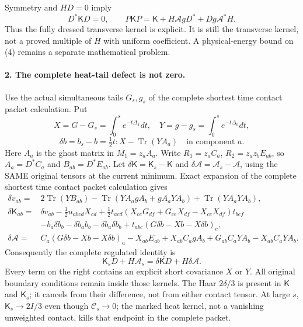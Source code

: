 \documentclass[11pt]{article}
\begin{document}
Symmetry and $HD=0$ imply
\[
 D^*\mathsf K D=0,\qquad
 \boxed{P\mathsf K P=\mathsf K+H\mathcal A gD^*
                                  +Dg\mathcal A^*H.}             \tag{4}
\]
Thus the fully dressed transverse kernel is explicit. It is still the
transverse kernel, not a proved multiple of $H$ with uniform coefficient.
A physical-energy bound on (4) remains a separate mathematical problem.

\paragraph{2. The complete heat-tail defect is not zero.}
Use the actual simultaneous tails $G_s,g_s$ of the complete shortest time contact packet calculation. Put
\[
 X=G-G_s=\int_0^s e^{-t\Delta_1}dt,\quad
 Y=g-g_s=\int_0^s e^{-t\Delta_0}dt,
\]
\[
 \delta b=b_s-b=\tfrac12t:X-\operatorname{Tr}(Y A_a)
 \quad\text{in component }a.
\]
Here $A_a$ is the ghost matrix in $M_1=z_a A_a$.
Write $R_1=z_a C_a$, $R_2=z_a z_b E_{ab}$, so
$A_a=D^*C_a$ and $B_{ab}=D^*E_{ab}$.
Let $\delta\mathsf K=\mathsf K_s-\mathsf K$ and
$\delta\mathcal A=\mathcal A_s-\mathcal A$, using the SAME original
tensors at the current minimum. Exact expansion of the complete shortest time contact packet calculation gives
\begin{align}
 \delta v_{ab}={}&2\operatorname{Tr}(YB_{ab})
 -\operatorname{Tr}(YA_agA_b+gA_aYA_b)
 +\operatorname{Tr}(YA_aYA_b),\\
 \delta\mathsf K_{ab}={}&\delta v_{ab}-\tfrac12u_{abcd}X_{cd}
 +\tfrac12t_{acd}(X_{ce}G_{df}+G_{ce}X_{df}-X_{ce}X_{df})t_{bef}\\
 &-b_a\delta b_b-\delta b_a b_b-\delta b_a\delta b_b
       +t_{abc}(G\delta b-Xb-X\delta b)_c,                       \tag{5}\\
 \delta\mathcal A={}&C_a(G\delta b-Xb-X\delta b)_a-X_{ab}E_{ab}
 +X_{ab}C_agA_b+G_{ab}C_aYA_b-X_{ab}C_aYA_b.                       \tag{6}
\end{align}
Consequently the complete regulated identity is
\[
 \boxed{\mathsf K_sD+H\mathcal A_s
                 =\delta\mathsf K D+H\delta\mathcal A.}         \tag{7}
\]
Every term on the right contains an explicit short covariance $X$ or
$Y$. All original boundary conditions remain inside those kernels.
The Haar $2\delta/3$ is present in $\mathsf K$ and $\mathsf K_s$;
it cancels from their difference, not from either contact tensor.
At large $s$, $\mathsf K_s\to2I/3$ even though $\mathcal C_s\to0$;
the marked heat kernel, not a vanishing unweighted contact, kills that
endpoint in the complete packet.
\end{document}
